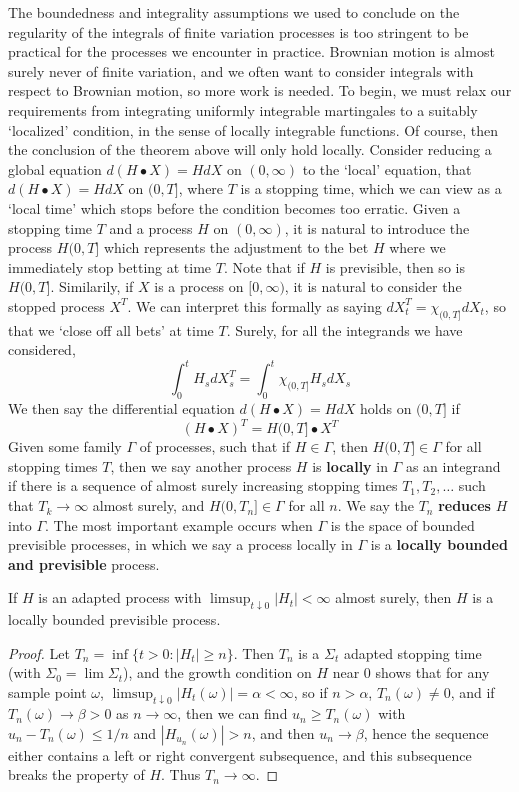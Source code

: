 The boundedness and integrality assumptions we used to conclude on the regularity of the integrals of finite variation processes is too stringent to be practical for the processes we encounter in practice. Brownian motion is almost surely never of finite variation, and we often want to consider integrals with respect to Brownian motion, so more work is needed. To begin, we must relax our requirements from integrating uniformly integrable martingales to a suitably `localized' condition, in the sense of locally integrable functions. Of course, then the conclusion of the theorem above will only hold locally. Consider reducing a global equation $d(H \bullet X) = HdX$ on $(0,\infty)$ to the `local' equation, that $d(H \bullet X) = HdX$ on $(0,T]$, where $T$ is a stopping time, which we can view as a `local time' which stops before the condition becomes too erratic. Given a stopping time $T$ and a process $H$ on $(0,\infty)$, it is natural to introduce the process $H(0,T]$ which represents the adjustment to the bet $H$ where we immediately stop betting at time $T$. Note that if $H$ is previsible, then so is $H(0,T]$. Similarily, if $X$ is a process on $[0,\infty)$, it is natural to consider the stopped process $X^T$. We can interpret this formally as saying $dX^T_t = \chi_{(0,T]} dX_t$, so that we `close off all bets' at time $T$. Surely, for all the integrands we have considered,
%
\[ \int_0^t H_s dX^T_s = \int_0^t \chi_{(0,T]} H_s dX_s \]
%
We then say the differential equation $d(H \bullet X) = HdX$ holds on $(0,T]$ if
%
\[ (H \bullet X)^T = H(0,T] \bullet X^T \]
%
Given some family $\Gamma$ of processes, such that if $H \in \Gamma$, then $H(0,T] \in \Gamma$ for all stopping times $T$, then we say another process $H$ is {\bf locally} in $\Gamma$ as an integrand if there is a sequence of almost surely increasing stopping times $T_1, T_2, \dots$ such that $T_k \to \infty$ almost surely, and $H(0,T_n] \in \Gamma$ for all $n$. We say the $T_n$ {\bf reduces} $H$ into $\Gamma$. The most important example occurs when $\Gamma$ is the space of bounded previsible processes, in which we say a process locally in $\Gamma$ is a {\bf locally bounded and previsible} process.

\begin{lemma}
    If $H$ is an adapted \caglad process with $\limsup_{t \downarrow 0} |H_t| < \infty$ almost surely, then $H$ is a locally bounded previsible process.
\end{lemma}
\begin{proof}
    Let $T_n = \inf \{ t > 0: |H_t| \geq n \}$. Then $T_n$ is a $\Sigma_t$ adapted stopping time (with $\Sigma_0 = \lim \Sigma_t$), and the growth condition on $H$ near $0$ shows that for any sample point $\omega$, $\limsup_{ t \downarrow 0} |H_t(\omega)| = \alpha < \infty$, so if $n > \alpha$, $T_n(\omega) \neq 0$, and if $T_n(\omega) \to \beta > 0$ as $n \to \infty$, then we can find $u_n \geq T_n(\omega)$ with $u_n - T_n(\omega) \leq 1/n$ and $|H_{u_n}(\omega)| > n$, and then $u_n \to \beta$, hence the sequence either contains a left or right convergent subsequence, and this subsequence breaks the \caglad property of $H$. Thus $T_n \to \infty$.
\end{proof}

